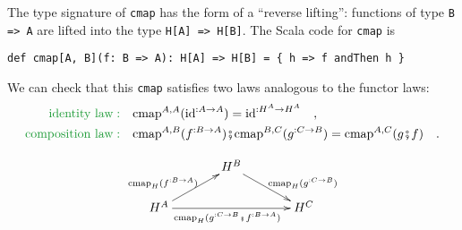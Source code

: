 The type signature of \lstinline!cmap! has the form of a \textsf{``}reverse
lifting\textsf{''}: functions of type \lstinline!B => A! are lifted into
the type \lstinline!H[A] => H[B]!. The Scala code for \lstinline!cmap!
is
\begin{lstlisting}
def cmap[A, B](f: B => A): H[A] => H[B] = { h => f andThen h } 
\end{lstlisting}
We can check that this \lstinline!cmap! satisfies two laws analogous
to the functor laws:
\begin{align*}
{\color{greenunder}\text{identity law}:}\quad & \text{cmap}^{A,A}(\text{id}^{:A\rightarrow A})=\text{id}^{:H^{A}\rightarrow H^{A}}\quad,\\
{\color{greenunder}\text{composition law}:}\quad & \text{cmap}^{A,B}(f^{:B\rightarrow A})\bef\text{cmap}^{B,C}(g^{:C\rightarrow B})=\text{cmap}^{A,C}(g\bef f)\quad.
\end{align*}

\begin{wrapfigure}{l}{0.4\columnwidth}%
\vspace{-2\baselineskip}
\[
\xymatrix{\xyScaleY{1.5pc}\xyScaleX{3pc} & H^{B}\ar[rd]\sp(0.6){\ ~\text{cmap}_{H}(g^{:C\rightarrow B})}\\
H^{A}\ar[ru]\sp(0.4){\text{cmap}_{H}(f^{:B\rightarrow A})\ }\ar[rr]\sb(0.5){\text{cmap}_{H}(g^{:C\rightarrow B}\bef f^{:B\rightarrow A})\ ~} &  & H^{C}
}
\]

\vspace{-2\baselineskip}
\end{wrapfigure}%

